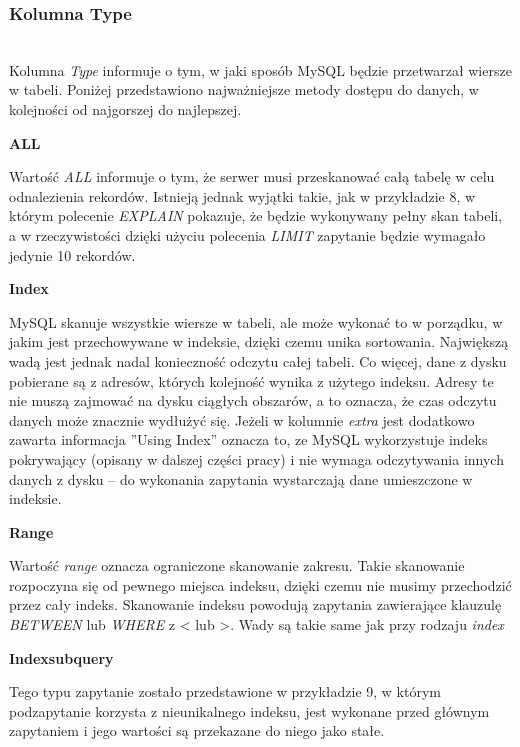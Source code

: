 \subsubsection{Kolumna Type}\leavevmode\\
Kolumna \textit{Type} informuje o tym, w jaki sposób MySQL będzie przetwarzał wiersze w tabeli. Poniżej przedstawiono najważniejsze metody dostępu do danych, w kolejności od najgorszej do najlepszej.

\centerline{\textbf{ALL}}
 \newline

Wartość \textit{ALL} informuje o tym, że serwer musi przeskanować całą tabelę w celu odnalezienia rekordów. Istnieją jednak wyjątki takie, jak w przykładzie 8, w którym polecenie \textit{EXPLAIN} pokazuje, że będzie wykonywany pełny skan tabeli, a w rzeczywistości dzięki użyciu polecenia \textit{LIMIT} zapytanie będzie wymagało jedynie 10 rekordów.

\centerline{\textbf{Index}}
\newline

MySQL skanuje wszystkie wiersze w tabeli, ale może wykonać to w porządku, w jakim jest przechowywane w indeksie, dzięki czemu unika sortowania. Największą wadą jest jednak nadal konieczność odczytu całej tabeli. Co więcej, dane z dysku pobierane są z adresów, których kolejność wynika z użytego indeksu. Adresy te nie muszą zajmować na dysku ciągłych obszarów, a to oznacza, że czas odczytu danych może znacznie wydłużyć się. Jeżeli w kolumnie \textit{extra} jest dodatkowo zawarta informacja ''Using Index'' oznacza to, ze MySQL wykorzystuje indeks pokrywający (opisany w dalszej części pracy) i nie wymaga odczytywania innych danych z dysku – do wykonania zapytania wystarczają dane umieszczone w indeksie.

\centerline{\textbf{Range}}
\newline

Wartość \textit{range} oznacza ograniczone skanowanie zakresu. Takie skanowanie rozpoczyna się od pewnego miejsca indeksu, dzięki czemu nie musimy przechodzić przez cały indeks. Skanowanie indeksu powodują zapytania zawierające klauzulę \textit{BETWEEN} lub \textit{WHERE} z < lub >. Wady są takie same jak przy rodzaju \textit{index}

\centerline{\textbf{Index\textunderscore subquery}}
\newline

Tego typu zapytanie zostało przedstawione w przykładzie 9, w którym podzapytanie korzysta z nieunikalnego indeksu, jest wykonane przed głównym zapytaniem i jego wartości są przekazane do niego jako stałe.

